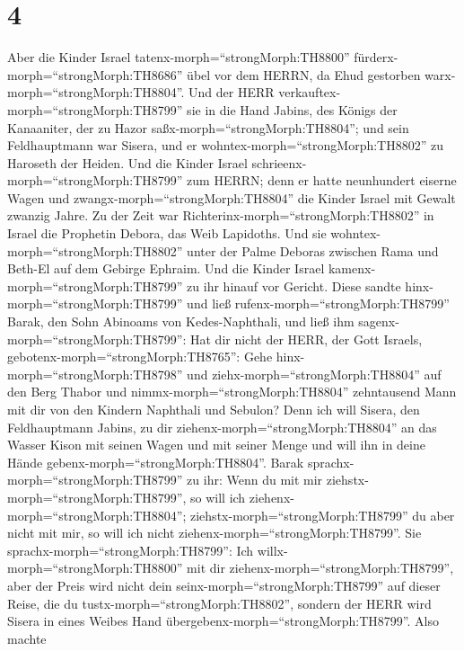 \hypertarget{section-3}{%
\section{4}\label{section-3}}

 Aber die Kinder Israel tatenx-morph=``strongMorph:TH8800''
fürderx-morph=``strongMorph:TH8686'' übel vor dem HERRN, da Ehud
gestorben warx-morph=``strongMorph:TH8804''.  Und der HERR
verkauftex-morph=``strongMorph:TH8799'' sie in die Hand Jabins, des
Königs der Kanaaniter, der zu Hazor saßx-morph=``strongMorph:TH8804'';
und sein Feldhauptmann war Sisera, und er
wohntex-morph=``strongMorph:TH8802'' zu Haroseth der Heiden.
 Und die Kinder Israel
schrieenx-morph=``strongMorph:TH8799'' zum HERRN; denn er hatte
neunhundert eiserne Wagen und zwangx-morph=``strongMorph:TH8804'' die
Kinder Israel mit Gewalt zwanzig Jahre.  Zu der Zeit war
Richterinx-morph=``strongMorph:TH8802'' in Israel die Prophetin Debora,
das Weib Lapidoths.  Und sie
wohntex-morph=``strongMorph:TH8802'' unter der Palme Deboras zwischen
Rama und Beth-El auf dem Gebirge Ephraim. Und die Kinder Israel
kamenx-morph=``strongMorph:TH8799'' zu ihr hinauf vor Gericht.
 Diese sandte hinx-morph=``strongMorph:TH8799'' und ließ
rufenx-morph=``strongMorph:TH8799'' Barak, den Sohn Abinoams von
Kedes-Naphthali, und ließ ihm sagenx-morph=``strongMorph:TH8799'': Hat
dir nicht der HERR, der Gott Israels,
gebotenx-morph=``strongMorph:TH8765'': Gehe
hinx-morph=``strongMorph:TH8798'' und ziehx-morph=``strongMorph:TH8804''
auf den Berg Thabor und nimmx-morph=``strongMorph:TH8804'' zehntausend
Mann mit dir von den Kindern Naphthali und Sebulon?  Denn
ich will Sisera, den Feldhauptmann Jabins, zu dir
ziehenx-morph=``strongMorph:TH8804'' an das Wasser Kison mit seinen
Wagen und mit seiner Menge und will ihn in deine Hände
gebenx-morph=``strongMorph:TH8804''.  Barak
sprachx-morph=``strongMorph:TH8799'' zu ihr: Wenn du mit mir
ziehstx-morph=``strongMorph:TH8799'', so will ich
ziehenx-morph=``strongMorph:TH8804'';
ziehstx-morph=``strongMorph:TH8799'' du aber nicht mit mir, so will ich
nicht ziehenx-morph=``strongMorph:TH8799''.  Sie
sprachx-morph=``strongMorph:TH8799'': Ich
willx-morph=``strongMorph:TH8800'' mit dir
ziehenx-morph=``strongMorph:TH8799'', aber der Preis wird nicht dein
seinx-morph=``strongMorph:TH8799'' auf dieser Reise, die du
tustx-morph=``strongMorph:TH8802'', sondern der HERR wird Sisera in
eines Weibes Hand übergebenx-morph=``strongMorph:TH8799''. Also machte
